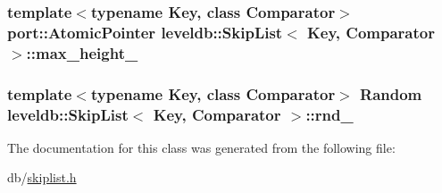 \hypertarget{classleveldb_1_1_skip_list_a08b97b9da8e1fd93d2c6ae4915dc132f}{
\subsubsection[{max\-\_\-height\-\_\-}]{\setlength{\rightskip}{0pt plus 5cm}template$<$typename Key, class Comparator$>$ {\bf port\-::\-Atomic\-Pointer} {\bf leveldb\-::\-Skip\-List}$<$ {\bf Key}, {\bf Comparator} $>$\-::max\-\_\-height\-\_\-\hspace{0.3cm}{\ttfamily [private]}}}\label{classleveldb_1_1_skip_list_a08b97b9da8e1fd93d2c6ae4915dc132f}
\hypertarget{classleveldb_1_1_skip_list_ae418eb7ce6b8e0a4ea95b8b782e02c9e}{
\subsubsection[{rnd\-\_\-}]{\setlength{\rightskip}{0pt plus 5cm}template$<$typename Key, class Comparator$>$ {\bf Random} {\bf leveldb\-::\-Skip\-List}$<$ {\bf Key}, {\bf Comparator} $>$\-::rnd\-\_\-\hspace{0.3cm}{\ttfamily [private]}}}\label{classleveldb_1_1_skip_list_ae418eb7ce6b8e0a4ea95b8b782e02c9e}


The documentation for this class was generated from the following file\-:\begin{DoxyCompactItemize}
\item 
db/\hyperlink{skiplist_8h}{skiplist.\-h}\end{DoxyCompactItemize}
